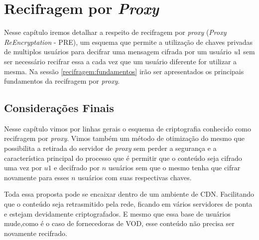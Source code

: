 \chapter{Recifragem por \emph{Proxy}}
Nesse capítulo iremos detalhar a respeito de recifragem por \emph{proxy} (\emph{Proxy ReEncryptation} - PRE), um esquema que permite a utilização de chaves privadas de multiplos usuários para decifrar uma mensagem cifrada por um usuário \emph{u}1 sem ser necessário recifrar essa a cada vez que um usuário diferente for utilizar a mesma. Na sessão \ref{recifragem:fundamentos} irão ser apresentados os principais fundamentos da recifragem por \emph{proxy}.




%
%


\section{Considerações Finais}

Nesse capítulo vimos por linhas gerais o esquema de criptografia conhecido como recifragem por \emph{proxy}. Vimos também um método de otimização do mesmo que possibilita a retirada do servidor de \emph{proxy} sem perder a segurança e a característica principal do processo que é permitir que o conteúdo seja cifrado uma vez por $u1$ e decifrado por $n$ usuários sem que o mesmo tenha que cifrar novamente para esses $n$ usuários com suas respectivas chaves.

Toda essa proposta pode se encaixar dentro de um ambiente de CDN. Facilitando que o conteúdo seja retrasmitido pela rede, ficando em vários servidores de ponta e estejam devidamente criptografados. E mesmo que essa base de usuários mude,como é o caso de fornecedoras de VOD, esse conteúdo não precisa ser novamente recifrado.